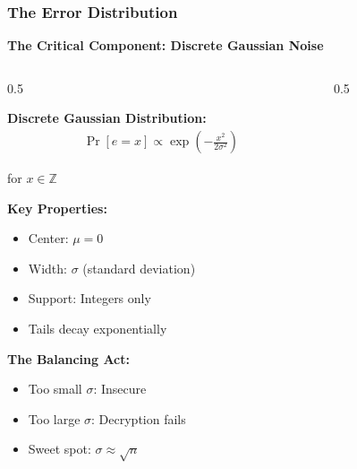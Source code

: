 \documentclass[aspectratio=169,10pt]{beamer}
\newcommand{\slideheader}[1]{\frametitle{#1}}
\theoremstyle{plain}
\begin{document}
\begin{frame}
  \slideheader{The Error Distribution}
  
  \begin{center}
    \textbf{\large The Critical Component: Discrete Gaussian Noise}
  \end{center}
  
  \vspace{0.3cm}
  
  \begin{columns}[T]
    \begin{column}{0.5\textwidth}

    \textbf{Discrete Gaussian Distribution:}
    \begin{align}
      \Pr[e = x] \propto \exp\left(-\frac{x^2}{2\sigma^2}\right)
    \end{align}
    
    for $x \in \mathbb{Z}$
    
    \vspace{0.3cm}
    
    \textbf{Key Properties:}
    \begin{itemize}
      \item Center: $\mu = 0$
      \item Width: $\sigma$ (standard deviation)
      \item Support: Integers only
      \item Tails decay exponentially
    \end{itemize}
    
    \vspace{0.3cm}
    
    \textbf{The Balancing Act:}
    \begin{itemize}
      \item Too small $\sigma$: Insecure
      \item Too large $\sigma$: Decryption fails
      \item Sweet spot: $\sigma \approx \sqrt{n}$
    \end{itemize}
  
    \end{column}
    \begin{column}{0.5\textwidth}

\end{column}
\end{columns}
\end{frame}
\end{document}
